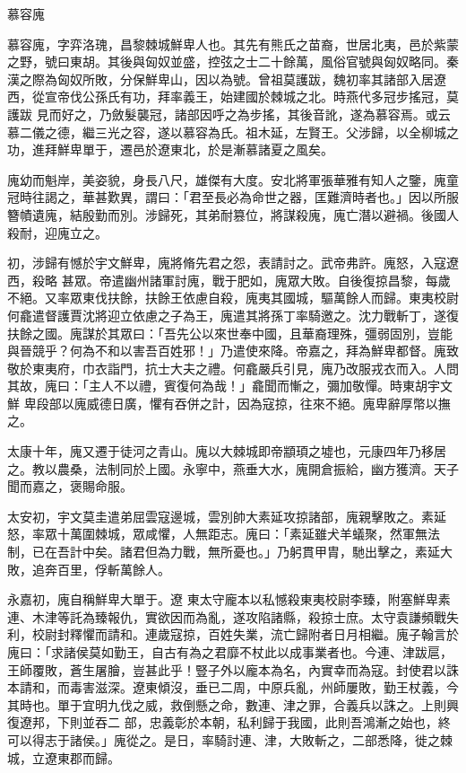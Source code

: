 
\begin{pinyinscope}

 慕容廆



 慕容廆，字弈洛瑰，昌黎棘城鮮卑人也。其先有熊氏之苗裔，世居北夷，邑於紫蒙之野，號曰東胡。其後與匈奴並盛，控弦之士二十餘萬，風俗官號與匈奴略同。秦漢之際為匈奴所敗，分保鮮卑山，因以為號。曾祖莫護跋，魏初率其諸部入居遼西，從宣帝伐公孫氏有功，拜率義王，始建國於棘城之北。時燕代多冠步搖冠，莫護跋
 見而好之，乃斂髮襲冠，諸部因呼之為步搖，其後音訛，遂為慕容焉。或云慕二儀之德，繼三光之容，遂以慕容為氏。祖木延，左賢王。父涉歸，以全柳城之功，進拜鮮卑單于，遷邑於遼東北，於是漸慕諸夏之風矣。



 廆幼而魁岸，美姿貌，身長八尺，雄傑有大度。安北將軍張華雅有知人之鑒，廆童冠時往謁之，華甚歎異，謂曰：「君至長必為命世之器，匡難濟時者也。」因以所服簪幘遺廆，結殷勤而別。涉歸死，其弟耐篡位，將謀殺廆，廆亡潛以避禍。後國人殺耐，迎廆立之。



 初，涉歸有憾於宇文鮮卑，廆將脩先君之怨，表請討之。武帝弗許。廆怒，入寇遼西，殺略
 甚眾。帝遣幽州諸軍討廆，戰于肥如，廆眾大敗。自後復掠昌黎，每歲不絕。又率眾東伐扶餘，扶餘王依慮自殺，廆夷其國城，驅萬餘人而歸。東夷校尉何龕遣督護賈沈將迎立依慮之子為王，廆遣其將孫丁率騎邀之。沈力戰斬丁，遂復扶餘之國。廆謀於其眾曰：「吾先公以來世奉中國，且華裔理殊，彊弱固別，豈能與晉競乎？何為不和以害吾百姓邪！」乃遣使來降。帝嘉之，拜為鮮卑都督。廆致敬於東夷府，巾衣詣門，抗士大夫之禮。何龕嚴兵引見，廆乃改服戎衣而入。人問其故，廆曰：「主人不以禮，賓復何為哉！」龕聞而慚之，彌加敬憚。時東胡宇文鮮
 卑段部以廆威德日廣，懼有吞併之計，因為寇掠，往來不絕。廆卑辭厚幣以撫之。



 太康十年，廆又遷于徒河之青山。廆以大棘城即帝顓頊之墟也，元康四年乃移居之。教以農桑，法制同於上國。永寧中，燕垂大水，廆開倉振給，幽方獲濟。天子聞而嘉之，褒賜命服。



 太安初，宇文莫圭遣弟屈雲寇邊城，雲別帥大素延攻掠諸部，廆親擊敗之。素延怒，率眾十萬圍棘城，眾咸懼，人無距志。廆曰：「素延雖犬羊蟻聚，然軍無法制，已在吾計中矣。諸君但為力戰，無所憂也。」乃躬貫甲胄，馳出擊之，素延大敗，追奔百里，俘斬萬餘人。



 永嘉初，廆自稱鮮卑大單于。遼
 東太守龐本以私憾殺東夷校尉李臻，附塞鮮卑素連、木津等託為臻報仇，實欲因而為亂，遂攻陷諸縣，殺掠士庶。太守袁謙頻戰失利，校尉封釋懼而請和。連歲寇掠，百姓失業，流亡歸附者日月相繼。廆子翰言於廆曰：「求諸侯莫如勤王，自古有為之君靡不杖此以成事業者也。今連、津跋扈，王師覆敗，蒼生屠膾，豈甚此乎！豎子外以龐本為名，內實幸而為寇。封使君以誅本請和，而毒害滋深。遼東傾沒，垂已二周，中原兵亂，州師屢敗，勤王杖義，今其時也。單于宜明九伐之威，救倒懸之命，數連、津之罪，合義兵以誅之。上則興復遼邦，下則並吞二
 部，忠義彰於本朝，私利歸于我國，此則吾鴻漸之始也，終可以得志于諸侯。」廆從之。是日，率騎討連、津，大敗斬之，二部悉降，徙之棘城，立遼東郡而歸。




\end{pinyinscope}
